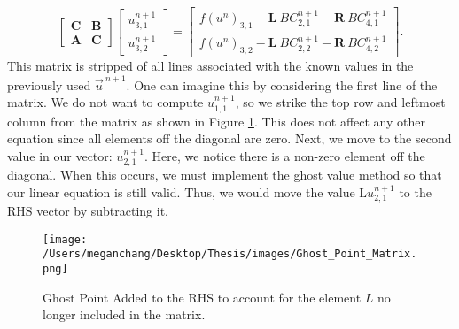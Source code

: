 \documentclass[oneside,12pt,final]{/Applications/TeX/packages/ucthesis-CA2012}
\begin{document}
\begin{mainmatter}
\begin{equation}
\begin{bmatrix}
\textbf{C} & \textbf{B}\\
\textbf{A} & \textbf{C}
\end{bmatrix}
\begin{bmatrix}
u^{n+1}_{3,1}\\
u^{n+1}_{3,2}
\end{bmatrix} = 
\begin{bmatrix}
f(u^{n})_{3,1} - \textbf{L} \> BC^{n+1}_{2,1} - \textbf{R} \> BC^{n+1}_{4,1}\\
f(u^{n})_{3,2} - \textbf{L} \> BC^{n+1}_{2,2} - \textbf{R} \> BC^{n+1}_{4,2}
\end{bmatrix}.
\end{equation}
This matrix is stripped of all lines associated with the known values in the previously used $\vec{u}^{\>n+1}$. One can imagine this by considering the first line of the matrix. We do not want to compute $u^{n+1}_{1,1}$, so we strike the top row and leftmost column from the matrix as shown in Figure \ref{fig:ghost_point_matrix}. This does not affect any other equation since all elements off the diagonal are zero. Next, we move to the second value in our vector: $u^{n+1}_{2,1}$. Here, we notice there is a non-zero element off the diagonal. When this occurs, we must implement the ghost value method so that our linear equation is still valid. Thus, we would move the value L$u^{n+1}_{2,1}$ to the RHS vector by subtracting it.

\begin{figure}[h]
\centering
\texttt{[image: /Users/meganchang/Desktop/Thesis/images/Ghost\_Point\_Matrix.png]}
\caption[How Ghost Points Work]{Ghost Point Added to the RHS to account for the element $L$ no longer included in the matrix.}
\label{fig:ghost_point_matrix}
\end{figure}


\end{mainmatter}
\end{document}
